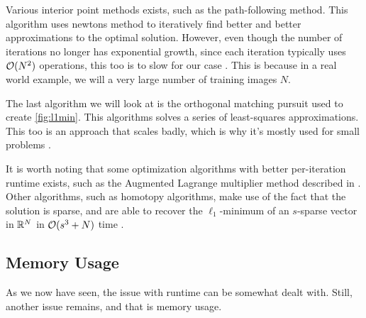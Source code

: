 Various interior point methods exists, such as the path-following method. This algorithm uses newtons method to iteratively find better and better approximations to the optimal solution. However, even though the number of iterations no longer has exponential growth, since each iteration typically uses $ \mathcal{O}(N^{2}) $ operations, this too is to slow for our case \cite[Section~12.6]{eldar12theoryapplic}. This is because in a real world example, we will a very large number of training images $ N $.

The last algorithm we will look at is the orthogonal matching pursuit used to create \cref{fig:l1min}. This algorithms solves a series of least-squares approximations. This too is an approach that scales badly, which is why it's mostly used for small problems \cite[Secion~3.2]{foucart13intro}.

It is worth noting that some optimization algorithms with better per-iteration runtime exists, such as the Augmented Lagrange multiplier method described in \cite[Alg.~12.2]{foucart13intro}. Other algorithms, such as homotopy algorithms, make use of the fact that the solution is sparse, and are able to recover the $ \ell_{1} $-minimum of an $ s $-sparse vector in $ \mathbb{R}^{N} $ in $ \mathcal{O}(s^{3} + N) $ time \cite{wright09facerecog}.



\subsection{Memory Usage}
As we now have seen, the issue with runtime can be somewhat dealt with. Still, another issue remains, and that is memory usage. 







